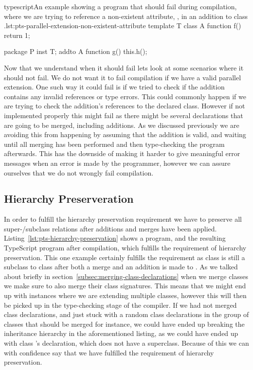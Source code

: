\begin{code}{typescript}{An example showing a program that should fail during compilation, where we are trying to reference a non-existent attribute, , in an addition to class .}{lst:pts-parallel-extension-non-existent-attribute}
    template T {
        class A {
            function f() {
                return 1;
            }
        }
    }

    package P {
        inst T;
        addto A {
            function g() {
                this.h();
            }
        }
    }
\end{code}

Now that we understand when it should fail lets look at some scenarios where it should not fail.
We do not want it to fail compilation if we have a valid parallel extension.
One such way it could fail is if we tried to check if the addition contains any invalid references or type errors.
This could commonly happen if we are trying to check the addition's references to the declared class.
However if not implemented properly this might fail as there might be several declarations that are going to be merged, including additions.
As we discussed previously we are avoiding this from happening by assuming that the addition is valid, and waiting until all merging has been performed and then type-checking the program afterwards.
This has the downside of making it harder to give meaningful error messages when an error is made by the programmer, however we can assure ourselves that we do not wrongly fail compilation.

\subsection{Hierarchy Preserveration}

In order to fulfill the hierarchy preservation requirement we have to preserve all super-/subclass relations after additions and merges have been applied.
Listing~\vref{lst:pts-hierarchy-preservation} shows a program, and the resulting TypeScript program after compilation, which fulfills the requirement of hierarchy preservation.
This one example certainly fulfills the requirement as class  is still a subclass to class  after both a merge and an addition is made to .
As we talked about briefly in section~\vref{subsec:merging-class-declarations} when we merge classes we make sure to also merge their class signatures.
This means that we might end up with instances where we are extending multiple classes, however this will then be picked up in the type-checking stage of the compiler.
If we had not merged class declarations, and just stuck with a random class declarations in the group of classes that should be merged for instance, we could have ended up breaking the inheritance hierarchy in the aforementioned listing, as we could have ended up with class 's declaration, which does not have a superclass.
Because of this we can with confidence say that we have fulfilled the requirement of hierarchy preservation.

